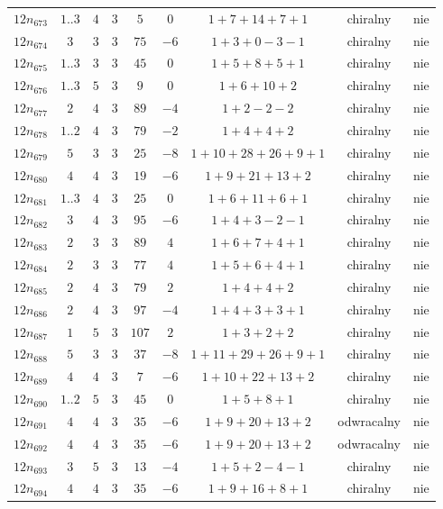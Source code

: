 \begin{longtable}{ccccccccc}
$12n_{673}$ & $1..3$ & $4$ & $3$ & $5$ & $0$ & $1+7+14+7+1$ & chiralny & nie \\
$12n_{674}$ & $3$ & $3$ & $3$ & $75$ & $-6$ & $1+3+0-3-1$ & chiralny & nie \\
$12n_{675}$ & $1..3$ & $3$ & $3$ & $45$ & $0$ & $1+5+8+5+1$ & chiralny & nie \\
$12n_{676}$ & $1..3$ & $5$ & $3$ & $9$ & $0$ & $1+6+10+2$ & chiralny & nie \\
$12n_{677}$ & $2$ & $4$ & $3$ & $89$ & $-4$ & $1+2-2-2$ & chiralny & nie \\
$12n_{678}$ & $1..2$ & $4$ & $3$ & $79$ & $-2$ & $1+4+4+2$ & chiralny & nie \\
$12n_{679}$ & $5$ & $3$ & $3$ & $25$ & $-8$ & $1+10+28+26+9+1$ & chiralny & nie \\
$12n_{680}$ & $4$ & $4$ & $3$ & $19$ & $-6$ & $1+9+21+13+2$ & chiralny & nie \\
$12n_{681}$ & $1..3$ & $4$ & $3$ & $25$ & $0$ & $1+6+11+6+1$ & chiralny & nie \\
$12n_{682}$ & $3$ & $4$ & $3$ & $95$ & $-6$ & $1+4+3-2-1$ & chiralny & nie \\
$12n_{683}$ & $2$ & $3$ & $3$ & $89$ & $4$ & $1+6+7+4+1$ & chiralny & nie \\
$12n_{684}$ & $2$ & $3$ & $3$ & $77$ & $4$ & $1+5+6+4+1$ & chiralny & nie \\
$12n_{685}$ & $2$ & $4$ & $3$ & $79$ & $2$ & $1+4+4+2$ & chiralny & nie \\
$12n_{686}$ & $2$ & $4$ & $3$ & $97$ & $-4$ & $1+4+3+3+1$ & chiralny & nie \\
$12n_{687}$ & $1$ & $5$ & $3$ & $107$ & $2$ & $1+3+2+2$ & chiralny & nie \\
$12n_{688}$ & $5$ & $3$ & $3$ & $37$ & $-8$ & $1+11+29+26+9+1$ & chiralny & nie \\
$12n_{689}$ & $4$ & $4$ & $3$ & $7$ & $-6$ & $1+10+22+13+2$ & chiralny & nie \\
$12n_{690}$ & $1..2$ & $5$ & $3$ & $45$ & $0$ & $1+5+8+1$ & chiralny & nie \\
$12n_{691}$ & $4$ & $4$ & $3$ & $35$ & $-6$ & $1+9+20+13+2$ & odwracalny & nie \\
$12n_{692}$ & $4$ & $4$ & $3$ & $35$ & $-6$ & $1+9+20+13+2$ & odwracalny & nie \\
$12n_{693}$ & $3$ & $5$ & $3$ & $13$ & $-4$ & $1+5+2-4-1$ & chiralny & nie \\
$12n_{694}$ & $4$ & $4$ & $3$ & $35$ & $-6$ & $1+9+16+8+1$ & chiralny & nie \\

\end{longtable}
